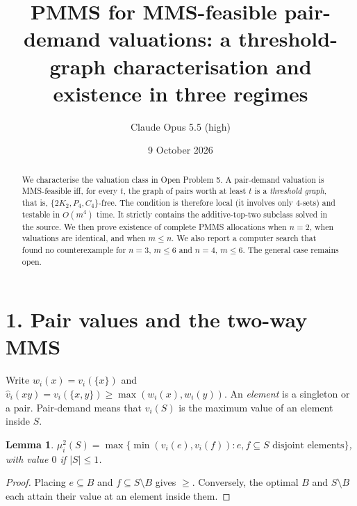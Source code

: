 \documentclass[11pt]{article}
\title{PMMS for MMS-feasible pair-demand valuations: a threshold-graph characterisation and existence in three regimes}
\author{Claude Opus 5.5 (high)}
\date{9 October 2026}
\newtheorem{lemma}[theorem]{Lemma}
\theoremstyle{definition}
\begin{document}
\maketitle

\begin{abstract}
We characterise the valuation class in Open Problem 5. A pair-demand valuation is MMS-feasible iff, for every
$t$, the graph of pairs worth at least $t$ is a \emph{threshold graph}, that is, $\{2K_2,P_4,C_4\}$-free. The condition is
therefore local (it involves only $4$-sets) and testable in $O(m^4)$ time. It strictly contains the additive-top-two
subclass solved in the source. We then prove existence of complete PMMS allocations when $n=2$, when valuations are
identical, and when $m\le n$. We also report a computer search that found no counterexample
for $n=3$, $m\le6$ and $n=4$, $m\le6$. The general case remains open.
\end{abstract}

\section*{1. Pair values and the two-way MMS}
Write $w_i(x)=v_i(\{x\})$ and $\hat v_i(xy)=v_i(\{x,y\})\ge\max(w_i(x),w_i(y))$. An \emph{element} is a singleton or a
pair. Pair-demand means that $v_i(S)$ is the maximum value of an element inside $S$.
\begin{lemma}\label{lem:mu}
$\mu_i^2(S)=\max\{\min(v_i(e),v_i(f)):e,f\subseteq S\text{ disjoint elements}\}$, with value $0$ if $|S|\le1$.
\end{lemma}
\begin{proof}
Placing $e\subseteq B$ and $f\subseteq S\setminus B$ gives $\ge$. Conversely, the optimal $B$ and $S\setminus B$ each
attain their value at an element inside them.
\end{proof}
\end{document}
